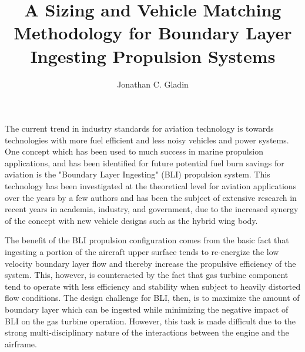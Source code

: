 \documentclass[12pt]{gatech-thesis}
\title{A Sizing and Vehicle Matching Methodology for Boundary Layer Ingesting Propulsion Systems} %
\author{Jonathan C. Gladin}
\begin{document}

\begin{preliminary}
\contents
\begin{summary}

\indent The current trend in industry standards for aviation technology is towards technologies with more fuel efficient and less noisy vehicles and power systems. One concept which has been used to much success in marine propulsion applications, and has been identified for future potential fuel burn savings for aviation is the "Boundary Layer Ingesting" (BLI) propulsion system.  This technology has been investigated at the theoretical level for aviation applications over the years by a few authors and has been the subject of extensive research in recent years in academia, industry, and government, due to the increased synergy of the concept with new vehicle designs such as the hybrid wing body.  

\indent The benefit of the BLI propulsion configuration comes from the basic fact that ingesting a portion of the aircraft upper surface tends to re-energize the low velocity boundary layer flow and thereby increase the propulsive efficiency of the system.  This, however, is counteracted by the fact that gas turbine component tend to operate with less efficiency and stability when subject to heavily distorted flow conditions.  The design challenge for BLI, then, is to maximize the amount of boundary layer which can be ingested while minimizing the negative impact of BLI on the gas turbine operation.  However, this task is made difficult due to the strong multi-disciplinary nature of the interactions between the engine and the airframe.


\end{summary}
\end{preliminary}
\end{document}
